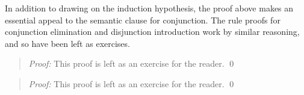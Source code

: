 In addition to drawing on the induction hypothesis, the proof above makes an essential appeal to the semantic clause for conjunction.
The rule proofs for conjunction elimination and disjunction introduction work by similar reasoning, and so have been left as exercises.


\begin{quote} 
  \textit{Proof:}
  This proof is left as an exercise for the reader.
  \qed
\end{quote}




\begin{quote} 
  \textit{Proof:}
  This proof is left as an exercise for the reader.
  \qed
\end{quote}




